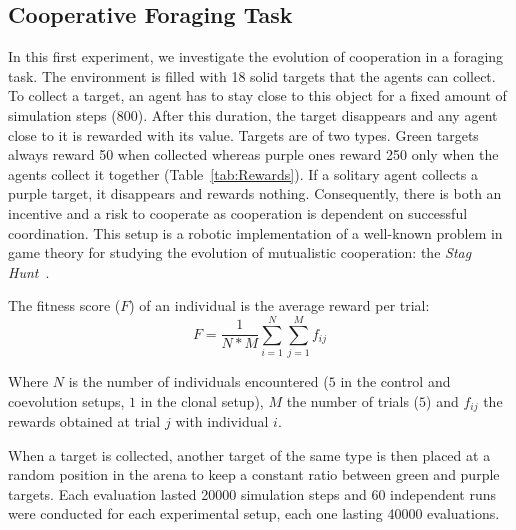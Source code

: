   \subsection{Cooperative Foraging Task}
  
  In this first experiment, we investigate the evolution of cooperation in a foraging task. The environment is filled with 18 solid targets that the agents can collect. To collect a target, an agent has to stay close to this object for a fixed amount of simulation steps (800). After this duration, the target disappears and any agent close to it is rewarded with its value. Targets are of two types. Green targets always reward 50 when collected whereas purple ones reward 250 only when the agents collect it together (Table~\ref{tab:Rewards}). If a solitary agent collects a purple target, it disappears and rewards nothing. Consequently, there is both an incentive and a risk to cooperate as cooperation is dependent on successful coordination. This setup is a robotic implementation of a well-known problem in game theory for studying the evolution of mutualistic cooperation: the {\em Stag Hunt}~\cite{Skyrms2004}.

  The fitness score (\(F\)) of an individual is the average reward per trial:
 \[
  F = \frac{1}{N*M} \sum_{i=1}^{N} \sum_{j=1}^{M} f_{ij}
  \]
  
  Where \(N\) is the number of individuals encountered ($5$ in the control and coevolution setups, $1$ in the clonal setup), \(M\) the number of trials ($5$) and \(f_{ij}\) the rewards obtained at trial \(j\) with individual \(i\).

  When a target is collected, another target of the same type is then placed at a random position in the arena to keep a constant ratio between green and purple targets. Each evaluation lasted 20000 simulation steps and 60 independent runs were conducted for each experimental setup, each one lasting 40000 evaluations.

  \begin{table}[hbtp]
    \caption{Rewards for the foraging of the different targets, depending on whether they were collected alone or cooperatively.}
    \label{tab:Rewards}
  \end{table}

